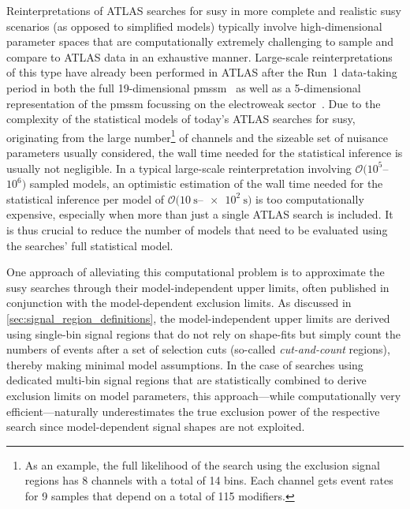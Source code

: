 Reinterpretations of ATLAS searches for \gls{susy} in more complete and realistic \gls{susy} scenarios (as opposed to simplified models) typically involve high-dimensional parameter spaces that are computationally extremely challenging to sample and compare to ATLAS data in an exhaustive manner.
Large-scale reinterpretations of this type have already been performed in ATLAS after the Run~1 data-taking period in both the full 19-dimensional \gls{pmssm}~\cite{pMSSM-scan-run1:2015baa} as well as a 5-dimensional representation of the \gls{pmssm} focussing on the electroweak sector~\cite{Aaboud:2016wna}.
Due to the complexity of the statistical models of today's ATLAS searches for \gls{susy}, originating from the large number\footnote{As an example, the full likelihood of the \onelepton search using the exclusion signal regions has 8 channels with a total of 14 bins. Each channel gets event rates for 9 samples that depend on a total of 115 modifiers.} of channels and the sizeable set of nuisance parameters usually considered, the wall time needed for the statistical inference is usually not negligible.
In a typical large-scale reinterpretation involving \mbox{$\mathcal{O}(10^5$--$10^6)$} sampled models, an optimistic estimation of the wall time needed for the statistical inference per model of \mbox{$\mathcal{O}(\SI{10}{\second}$--$\SI{e2}{\second})$} is too computationally expensive, especially when more than just a single ATLAS search is included.
It is thus crucial to reduce the number of models that need to be evaluated using the searches' full statistical model.

One approach of alleviating this computational problem is to approximate the \gls{susy} searches through their model-independent upper limits, often published in conjunction with the model-dependent exclusion limits.
As discussed in \cref{sec:signal_region_definitions}, the model-independent upper limits are derived using single-bin signal regions that do not rely on shape-fits but simply count the numbers of events after a set of selection cuts (so-called \textit{cut-and-count} regions), thereby making minimal model assumptions.
In the case of searches using dedicated multi-bin signal regions that are statistically combined to derive exclusion limits on model parameters, this approach---while computationally very efficient---naturally underestimates the true exclusion power of the respective search since model-dependent signal shapes are not exploited.

